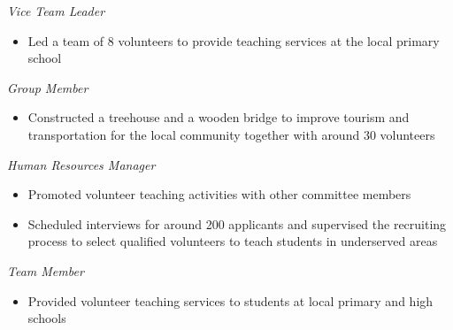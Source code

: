 \documentclass[11pt,letterpaper]{article}
\begin{document}
\cventryspace
{}
\textit{Vice Team Leader}\par
\begin{itemize}
  \item Led a team of 8 volunteers to provide teaching services at the local primary school
\end{itemize}

\cventryspace
{}
\textit{Group Member}\par
\begin{itemize}
  \item Constructed a treehouse and a wooden bridge to improve tourism and transportation for the local community together with around 30 volunteers
\end{itemize}

\cventryspace
{}
\textit{Human Resources Manager}\par
\begin{itemize}
  \item Promoted volunteer teaching activities with other committee members
  \item Scheduled interviews for around 200 applicants and supervised the recruiting process to select qualified volunteers to teach students in underserved areas
\end{itemize}

\cventryspace
{}
\textit{Team Member}\par
\begin{itemize}
  \item Provided volunteer teaching services to students at local primary and high schools
\end{itemize}
\end{document}

